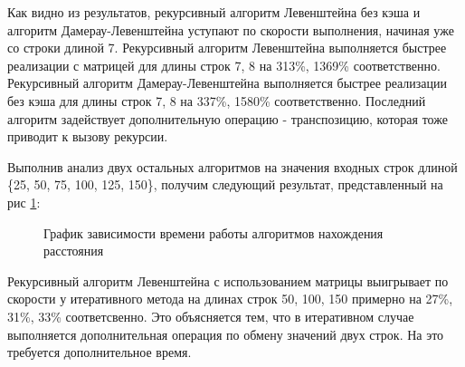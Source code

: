 Как видно из результатов, рекурсивный алгоритм Левенштейна без кэша и алгоритм Дамерау-Левенштейна уступают по скорости выполнения, начиная уже со строки длиной 7. Рекурсивный алгоритм Левенштейна выполняется быстрее реализации с матрицей для длины строк 7, 8 на 313\%, 1369\% соответственно. Рекурсивный алгоритм Дамерау-Левенштейна выполняется быстрее реализации без кэша для длины строк 7, 8 на 337\%, 1580\% соответственно. Последний алгоритм задействует дополнительную операцию - транспозицию, которая тоже приводит к вызову рекурсии.

Выполнив анализ двух остальных алгоритмов на значения входных строк длиной \{25, 50, 75, 100, 125, 150\}, получим следующий результат, представленный на рис  \ref{fg:6_2}:
\begin{figure}[H]
	\centering
	\caption{График зависимости времени работы алгоритмов нахождения расстояния} 
	\label{fg:6_2}
\end{figure} 

Рекурсивный алгоритм Левенштейна с использованием матрицы выигрывает по скорости у итеративного метода на длинах строк 50, 100, 150 примерно на 27\%, 31\%, 33\% соответсвенно. Это объясняется тем, что в итеративном случае выполняется дополнительная операция по обмену значений двух строк. На это требуется дополнительное время.

